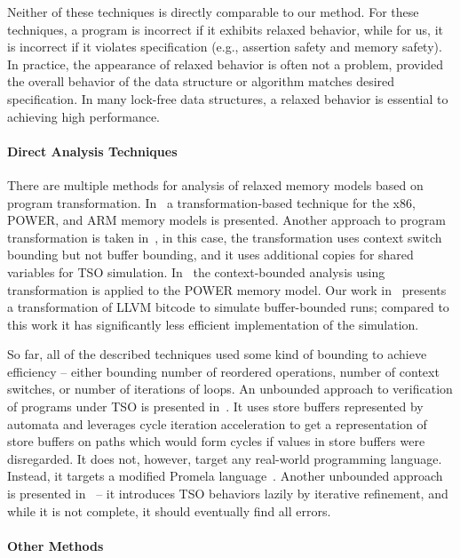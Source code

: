 Neither of these techniques is directly comparable to our method.
For these techniques, a program is incorrect if it exhibits relaxed behavior, while for us, it is incorrect if it violates specification (e.g., assertion safety and memory safety).
In practice, the appearance of relaxed behavior is often not a problem, provided the overall behavior of the data structure or algorithm matches desired specification.
In many lock-free data structures, a relaxed behavior is essential to achieving high performance.

\paragraph{Direct Analysis Techniques}

There are multiple methods for analysis of relaxed memory models based on program transformation.
In~\cite{Alglave2013} a transformation-based technique for the x86, POWER, and ARM memory models is presented.
Another approach to program transformation is taken in~\cite{Atig2011}, in this case, the transformation uses context switch bounding but not buffer bounding, and it uses additional copies for shared variables for TSO simulation.
In~\cite{Abdulla2017} the context-bounded analysis using transformation is applied to the POWER memory model.
Our work in~\cite{SRB15weakmem} presents a transformation of LLVM bitcode to simulate buffer-bounded \xtso runs; compared to this work it has significantly less efficient implementation of the \xtso simulation.


So far, all of the described techniques used some kind of bounding to achieve efficiency -- either bounding number of reordered operations, number of context switches, or number of iterations of loops.
An unbounded approach to verification of programs under TSO is presented in~\cite{Linden2010}.
It uses store buffers represented by automata and leverages cycle iteration acceleration to get a representation of store buffers on paths which would form cycles if values in store buffers were disregarded.
It does not, however, target any real-world programming language.
Instead, it targets a modified Promela language~\cite{Holzmann1997}.
Another unbounded approach is presented in~\cite{Bouajjani2015} -- it introduces TSO behaviors lazily by iterative refinement, and while it is not complete, it should eventually find all errors.

\paragraph{Other Methods}\label{other-methods}

